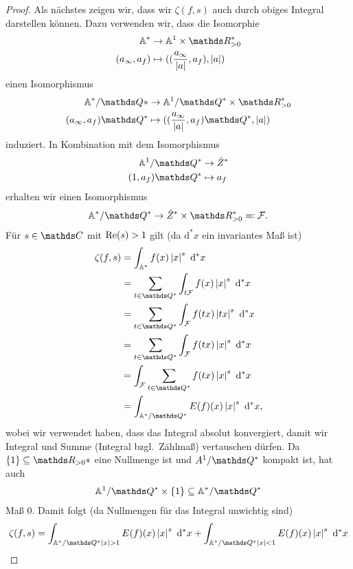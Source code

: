\begin{proof}
Als nächstes zeigen wir, dass wir $\zeta(f,s)$ auch durch obiges Integral darstellen können.
Dazu verwenden wir, dass die Isomorphie
\begin{align*}
\A^\ast &\to \A^1\times \R_{>0}^\ast\\
(a_\infty,a_f)&\mapsto ((\frac{a_\infty}{\abs{a}},a_f),\abs{a})
\end{align*}
einen Isomorphismus
\begin{align*}
\A^\ast/\Q\ast  &\to \A^1/\Q^\ast \times \R_{>0}^\ast\\
(a_\infty,a_f)\Q^\ast&\mapsto ((\frac{a_\infty}{\abs{a}},a_f)\Q^\ast,\abs{a})
\end{align*}
induziert.
In Kombination mit dem Isomorphismus
\begin{align*}
\A^1/\Q^\ast &\to \hat{Z} ^\ast\\
(1,a_f)\Q^\ast &\mapsto a_f
\end{align*}
erhalten wir einen Isomorphismus
\begin{align*}
\A^\ast/\Q^\ast \to \hat{Z} ^\ast \times \R_{>0}^\ast \eqqcolon \mathcal{F}.
\end{align*}
Für $s\in \C$ mit $\operatorname{Re}(s)>1$ gilt (da $\mathrm{d}^\ast x$ ein invariantes Maß ist)
\begin{align*}
\zeta(f,s)&=\int_{\A^\ast} f(x)\abs{x}^s~\mathrm{d}^\ast x\\
&=\sum_{t\in \Q^\ast}\int_{t\mathcal{F}} f(x)\abs{x}^s~\mathrm{d}^\ast x\\
&=\sum_{t \in \Q^\ast} \int_\mathcal{F} f(tx)\abs{tx}^s~\mathrm{d}^\ast x\\
&=\sum_{t \in \Q^\ast} \int_\mathcal{F} f(tx)\abs{x}^s~\mathrm{d}^\ast x\\
&=\int_\mathcal{F} \sum_{t \in \Q^\ast} f(tx)\abs{x}^s ~\mathrm{d}^\ast x\\
&=\int_{\A^\ast/\Q^\ast} E(f)(x)\abs{x}^s ~\mathrm{d}^\ast x,
\end{align*}
wobei wir verwendet haben, dass das Integral absolut konvergiert, damit wir Integral und Summe (Integral bzgl.\, Zählmaß) vertauschen dürfen.
Da $\{1\}\subseteq \R_{>0}\ast$ eine Nullmenge ist und $A^1/\Q^\ast$ kompakt ist, hat auch
\begin{align*}
\A^1/\Q^\ast \times \{1\}\subseteq \A^\ast/\Q^\ast
\end{align*}
Maß $0$.
Damit folgt (da Nullmengen für das Integral unwichtig sind)
\begin{align*}
\zeta(f,s)=\int_{\A^\ast /\Q^\ast \abs{x}>1} E(f)(x)\abs{x}^s~\mathrm{d}^\ast x + \int_{\A^\ast /\Q^\ast \abs{x}<1} E(f)(x)\abs{x}^s~\mathrm{d}^\ast x

\end{align*}
\end{proof}
